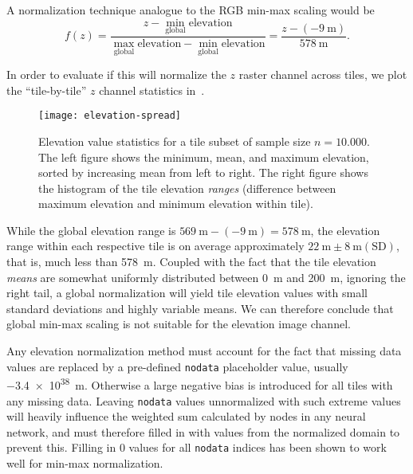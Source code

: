 A normalization technique analogue to the RGB min-max scaling would be
\begin{equation*}
  f(z)
  =
  \frac{
    z - \underset{\mathrm{global}}{\min} \text{elevation}
  }{
    \underset{\mathrm{global}}{\max} \text{elevation} - \underset{\mathrm{global}}{\min} \text{elevation}
  }
  =
  \frac{
    z - (\SI{-9}{\meter})
  }{
    \SI{578}{\meter}
  }.
\end{equation*}

In order to evaluate if this will normalize the $z$ raster channel across tiles, we plot the \enquote{tile-by-tile} $z$ channel statistics in~.

\begin{figure}[H]
  \centering
  \texttt{[image: elevation-spread]}
  \caption{
    Elevation value statistics for a tile subset of sample size $n = 10.000$.
    The left figure shows the minimum, mean, and maximum elevation, sorted by increasing mean from left to right.
    The right figure shows the histogram of the tile elevation \textit{ranges} (difference between maximum elevation and minimum elevation within tile).
  }%
  \label{fig:elevation-spread}
\end{figure}

While the global elevation range is $\SI{569}{\meter} - (\SI{-9}{\meter}) = \SI{578}{\meter}$, the elevation range within each respective tile is on average approximately $\SI{22}{\meter} \pm \SI{8}{\meter} (\mathrm{SD})$, that is, much less than \SI{578}{\meter}.
Coupled with the fact that the tile elevation \textit{means} are somewhat uniformly distributed between \SI{0}{\meter} and \SI{200}{\meter}, ignoring the right tail, a global normalization will yield tile elevation values with small standard deviations and highly variable means.
We can therefore conclude that global min-max scaling is not suitable for the elevation image channel.


Any elevation normalization method must account for the fact that missing data values are replaced by a pre-defined \texttt{nodata} placeholder value, usually \SI{-3.4e38}{\meter}.
Otherwise a large negative bias is introduced for all tiles with any missing data.
Leaving \texttt{nodata} values unnormalized with such extreme values will heavily influence the weighted sum calculated by nodes in any neural network, and must therefore filled in with values from the normalized domain to prevent this.
Filling in $0$ values for all \texttt{nodata} indices has been shown to work well for min-max normalization.

